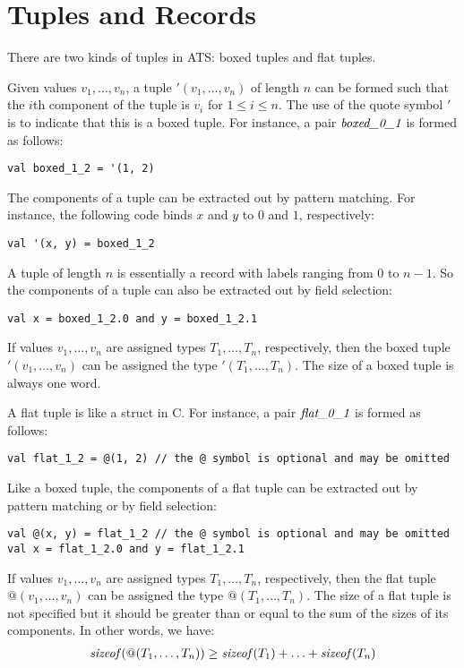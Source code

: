 \section{Tuples and Records}
There are two kinds of tuples in ATS: boxed tuples and flat tuples.

Given values $v_1,\ldots, v_n$, a tuple $'(v_1,\ldots,v_n)$ of length $n$
can be formed such that the $i$th component of the tuple is $v_i$ for
$1\leq i\leq n$. The use of the quote symbol $'$ is to indicate that this
is a boxed tuple.  For instance, a pair $\mbox{\it boxed\_0\_1}$ is
formed as follows:
\begin{verbatim}
val boxed_1_2 = '(1, 2)
\end{verbatim}
The components of a tuple can be extracted out by pattern matching. For
instance, the following code binds $x$ and $y$ to $0$ and $1$,
respectively:
\begin{verbatim}
val '(x, y) = boxed_1_2
\end{verbatim}
A tuple of length $n$ is essentially a record with labels ranging from $0$
to $n-1$. So the components of a tuple can also be extracted out by field
selection:
\begin{verbatim}
val x = boxed_1_2.0 and y = boxed_1_2.1
\end{verbatim}
If values $v_1,\ldots,v_n$ are assigned types $T_1,\ldots,T_n$,
respectively, then the boxed tuple $'(v_1,\ldots,v_n)$ can be assigned the type
$'(T_1,\ldots,T_n)$. The size of a boxed tuple is always one word.

A flat tuple is like a struct in C. For instance, a pair $\mbox{\it
flat\_0\_1}$ is formed as follows:
\begin{verbatim}
val flat_1_2 = @(1, 2) // the @ symbol is optional and may be omitted
\end{verbatim}
Like a boxed tuple, the components of a flat tuple can be extracted out
by pattern matching or by field selection:
\begin{verbatim}
val @(x, y) = flat_1_2 // the @ symbol is optional and may be omitted
val x = flat_1_2.0 and y = flat_1_2.1
\end{verbatim}
If values $v_1,\ldots,v_n$ are assigned types $T_1,\ldots,T_n$,
respectively, then the flat tuple $@(v_1,\ldots,v_n)$ can be assigned the
type $@(T_1,\ldots,T_n)$. The size of a flat tuple is not specified but it
should be greater than or equal to the sum of the sizes of
its components. In other words, we have:
\[\begin{array}{l}
{\it sizeof}(@(T_1,\ldots,T_n)) \geq {\it sizeof}(T_1) + \ldots + {\it sizeof}(T_n)
\end{array}\]

